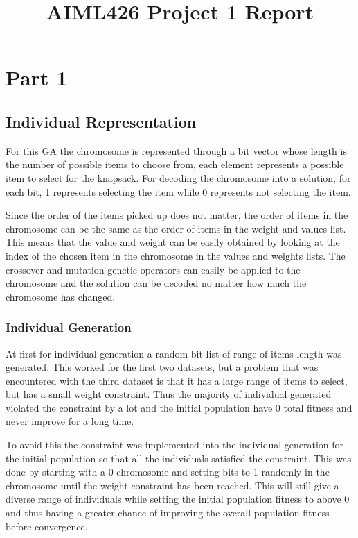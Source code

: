 \documentclass{article}
\title{AIML426 Project 1 Report}
\date{}
\begin{document}
\maketitle
\section*{Part 1}
\subsection*{Individual Representation}
For this GA the chromosome is represented through a bit vector whose length is the number of possible items to choose from, each element represents a possible item to select for the knapsack. For decoding the chromosome into a solution, for each bit, 1 represents selecting the item while 0 represents not selecting the item.  \par
\noindent Since the order of the items picked up does not matter, the order of items in the chromosome can be the same as the order of items in the weight and values list. This means that the value and weight can be easily obtained by looking at the index of the chosen item in the chromosome in the values and weights lists. The crossover and mutation genetic operators can easily be applied to the chromosome and the solution can be decoded no matter how much the chromosome has changed. \par
\subsubsection*{Individual Generation}
\noindent At first for individual generation a random bit list of range of items length was generated. This worked for the first two datasets, but a problem that was encountered with the third dataset is that it has a large range of items to select, but has a small weight constraint. Thus the majority of individual generated violated the constraint by a lot and the initial population have 0 total fitness and never improve for a long time. \par
\noindent To avoid this the constraint was implemented into the individual generation for the initial population so that all the individuals satisfied the constraint. This was done by starting with a 0 chromosome and setting bits to 1 randomly in the chromosome until the weight constraint has been reached. This will still give a diverse range of individuals while setting the initial population fitness to above 0 and thus having a greater chance of improving the overall population fitness before convergence. \par
\end{document}
